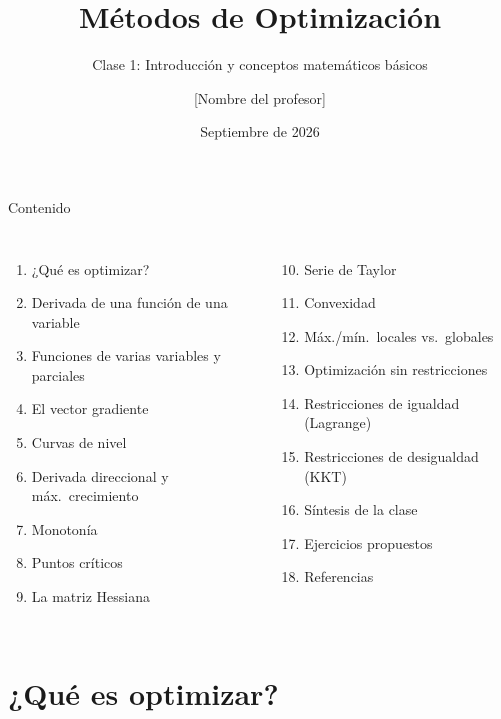 \documentclass[aspectratio=169,10pt]{beamer}
\title{Métodos de Optimización}
\subtitle{Clase 1: Introducción y conceptos matemáticos básicos}
\author{[Nombre del profesor]}
\institute{Programa de Maestría, [Nombre de la universidad / programa]}
\date{Septiembre de 2026}
\begin{document}
\begin{frame}[plain]
  \maketitle
\end{frame}

\begin{frame}{Contenido}
  \footnotesize
  \begin{columns}[T]
    \begin{enumerate}
      \setcounter{enumi}{0}
      \item ¿Qué es optimizar?
      \item Derivada de una función de una variable
      \item Funciones de varias variables y parciales
      \item El vector gradiente
      \item Curvas de nivel
      \item Derivada direccional y máx.\ crecimiento
      \item Monotonía
      \item Puntos críticos
      \item La matriz Hessiana
    \end{enumerate}
    \begin{enumerate}
      \setcounter{enumi}{9}
      \item Serie de Taylor
      \item Convexidad
      \item Máx./mín.\ locales vs.\ globales
      \item Optimización sin restricciones
      \item Restricciones de igualdad (Lagrange)
      \item Restricciones de desigualdad (KKT)
      \item Síntesis de la clase
      \item Ejercicios propuestos
      \item Referencias
    \end{enumerate}
  \end{columns}
\end{frame}

\section{¿Qué es optimizar?}
\end{document}
